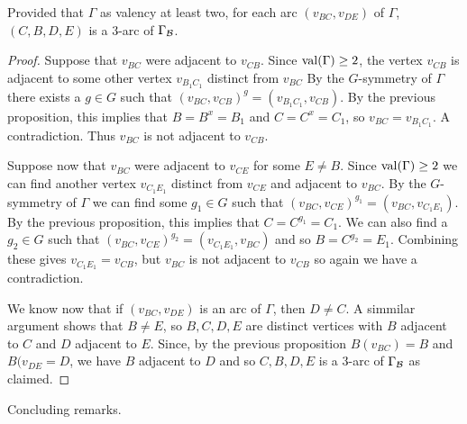 \begin{proposition}
\label{PE implies 3-arc}
Provided that $\Gamma$ as valency at least two,
for each arc $(v_{BC}, v_{DE})$ of $\Gamma$,
$(C,B,D,E)$ is a 3-arc of $\Gamma_{\mathcal{B}}$.

\begin{proof}
Suppose that $v_{BC}$ were adjacent to $v_{CB}$.
Since $\operatorname{val}(\Gamma) \geq 2$, the vertex $v_{CB}$
is adjacent to some other vertex $v_{B_1C_1}$ 
distinct from $v_{BC}$
By the $G$-symmetry of $\Gamma$ there exists a $g \in G$
such that $(v_{BC},v_{CB})^g = (v_{B_1C_1},v_{CB})$.
By the previous proposition, this implies that 
$B = B^x = B_1$ and $C = C^x = C_1$, so $v_{BC} = v_{B_1C_1}$.
A contradiction. Thus $v_{BC}$ is not adjacent to $v_{CB}$.

Suppose now that $v_{BC}$ were adjacent to $v_{CE}$
for some $E \neq B$.
Since $\operatorname{val}(\Gamma) \geq 2$ we can find another vertex $v_{C_1E_1}$
distinct from $v_{CE}$ and adjacent to $v_{BC}$.
By the $G$-symmetry of $\Gamma$ we can find some $g_1 \in G$
such that $(v_{BC},v_{CE})^{g_1} = (v_{BC},v_{C_1E_1})$.
By the previous proposition, this implies that $C = C^{g_1} = C_1$.
We can also find a $g_2 \in G$
such that $(v_{BC},v_{CE})^{g_2} = (v_{C_1E_1}, v_{BC})$
and so 
$B = C^{g_2} = E_1$. Combining these gives $v_{C_1E_1} = v_{CB}$, 
but $v_{BC}$ is not adjacent to $v_{CB}$
so again we have a contradiction.

We know now that if $(v_{BC}, v_{DE})$ is an arc of $\Gamma$,
then $D \neq C$. A simmilar argument shows that $B \neq E$,
so $B,C,D,E$ are distinct vertices with $B$ adjacent to $C$
and $D$ adjacent to $E$. Since, by the previous proposition
$B(v_{BC}) = B$ and $B(v_{DE} = D$, we have $B$ adjacent to $D$
and so $C,B,D,E$ is a 3-arc of $\Gamma_{\mathcal{B}}$ as claimed.

\end{proof}
\end{proposition}

Concluding remarks.



